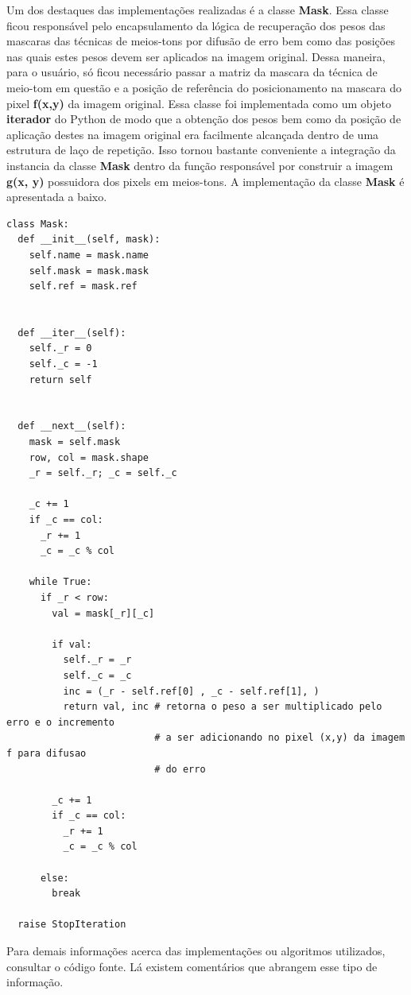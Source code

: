 \documentclass{article}
\begin{document}
Um dos destaques das implementações realizadas é a classe \textbf{Mask}. Essa classe ficou responsável pelo encapsulamento da lógica de recuperação dos pesos das mascaras das técnicas de meios-tons por difusão de erro bem como das posições nas quais estes pesos devem ser aplicados na imagem original. Dessa maneira, para o usuário, só ficou necessário passar a matriz da mascara da técnica de meio-tom em questão e a posição de referência do posicionamento na mascara do pixel \textbf{f(x,y)} da imagem original. Essa classe foi implementada como um objeto \textbf{iterador} do Python de modo que a obtenção dos pesos bem como da posição de aplicação destes na imagem original era facilmente alcançada dentro de uma estrutura de laço de repetição. Isso tornou bastante conveniente a integração da instancia da classe \textbf{Mask} dentro da função responsável por construir a imagem \textbf{g(x, y)} possuidora dos pixels em meios-tons. A implementação da classe \textbf{Mask} é apresentada a baixo.

\begin{lstlisting}
class Mask:
  def __init__(self, mask):
    self.name = mask.name
    self.mask = mask.mask
    self.ref = mask.ref


  def __iter__(self):
    self._r = 0
    self._c = -1 
    return self


  def __next__(self):
    mask = self.mask
    row, col = mask.shape
    _r = self._r; _c = self._c

    _c += 1
    if _c == col:
      _r += 1 
      _c = _c % col

    while True:
      if _r < row:
        val = mask[_r][_c]

        if val:
          self._r = _r
          self._c = _c
          inc = (_r - self.ref[0] , _c - self.ref[1], )
          return val, inc # retorna o peso a ser multiplicado pelo erro e o incremento
                          # a ser adicionando no pixel (x,y) da imagem f para difusao
                          # do erro

        _c += 1
        if _c == col:
          _r += 1 
          _c = _c % col

      else:
        break

  raise StopIteration
\end{lstlisting}

Para demais informações acerca das implementações ou algoritmos utilizados, consultar o código fonte. Lá existem comentários que abrangem esse tipo de informação.
\end{document}
